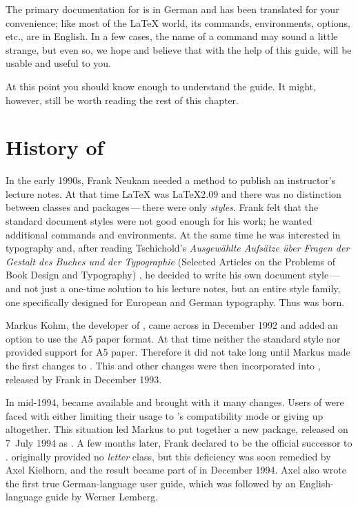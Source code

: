 \begin{Explain} 
  The primary documentation for {\KOMAScript} is in German and has been
  translated for your convenience; like most of the {\LaTeX} world, its
  commands, environments, options, etc., are in English. In a few cases, the
  name of a command may sound a little strange, but even so, we hope and
  believe that with the help of this guide, {\KOMAScript} will be usable
  and useful to you.
\end{Explain}

At this point you should know enough to understand the guide.
It might, however, still be worth reading the rest of this chapter.

\section{History of {\KOMAScript}}

In the early 1990s, Frank Neukam needed a method to publish an instructor's
lecture notes. At that time {\LaTeX} was {\LaTeX}2.09 and there was no
distinction between classes and packages\,---\,there were only \emph{styles}.
Frank felt that the standard document styles were not good enough for his
work; he wanted additional commands and environments. At the same time he was
interested in typography and, after reading Tschichold's \emph{Ausgew\"ahlte
  Aufs\"atze \"uber Fragen der Gestalt des Buches und der Typographie}
(Selected Articles on the Problems of Book Design and Typography)
\cite{JTsch87}, he decided to write his own document style\,---\,and not just
a one-time solution to his lecture notes, but an entire style family, one
specifically designed for European and German typography. Thus {\Script} was
born.

Markus Kohm, the developer of {\KOMAScript}, came across {\Script} in December
1992 and added an option to use the A5 paper format. At that time neither the
standard style nor {\Script} provided support for A5 paper. Therefore it did
not take long until Markus made the first changes to {\Script}. This and other
changes were then incorporated into {\ScriptII}, released by Frank in December
1993.

In mid-1994, {\LaTeXe} became available and brought with it many changes.
Users of {\ScriptII} were faced with either limiting their usage to
{\LaTeXe}'s compatibility mode or giving up {\Script} altogether.  This
situation led Markus to put together a new {\LaTeXe} package, released on
7~July 1994 as {\KOMAScript}. A few months later, Frank declared {\KOMAScript}
to be the official successor to {\Script}. {\KOMAScript} originally provided
no \emph{letter} class, but this deficiency was soon remedied by Axel
Kielhorn, and the result became part of {\KOMAScript} in December 1994.  Axel
also wrote the first true German-language user guide, which was followed by an
English-language guide by Werner Lemberg.

